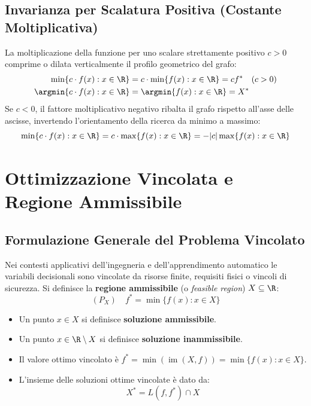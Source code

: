 \subsection{Invarianza per Scalatura Positiva (Costante Moltiplicativa)}
La moltiplicazione della funzione per uno scalare strettamente positivo $c > 0$ comprime o dilata verticalmente il profilo geometrico del grafo:
\begin{align}
\min \{ c \cdot f(x) : x \in \R \} &= c \cdot \min \{ f(x) : x \in \R \} = c f^* \quad (c > 0) \\
\argmin \{ c \cdot f(x) : x \in \R \} &= \argmin \{ f(x) : x \in \R \} = X^*
\end{align}
Se $c < 0$, il fattore moltiplicativo negativo ribalta il grafo rispetto all'asse delle ascisse, invertendo l'orientamento della ricerca da minimo a massimo:
\begin{equation}
\min \{ c \cdot f(x) : x \in \R \} = c \cdot \max \{ f(x) : x \in \R \} = - |c| \max \{ f(x) : x \in \R \}
\end{equation}


\FloatBarrier
\section{Ottimizzazione Vincolata e Regione Ammissibile}
\label{sec:opt-vincolata-regione-ammissibile}

\subsection{Formulazione Generale del Problema Vincolato}
Nei contesti applicativi dell'ingegneria e dell'apprendimento automatico le variabili decisionali sono vincolate da risorse finite, requisiti fisici o vincoli di sicurezza. Si definisce la \textbf{regione ammissibile} (o \textit{feasible region}) $X \subseteq \R$:
\begin{equation}
(P_X) \quad f^* = \min \{ f(x) : x \in X \}
\end{equation}
\begin{itemize}
    \item Un punto $x \in X$ si definisce \textbf{soluzione ammissibile}.
    \item Un punto $x \in \R \setminus X$ si definisce \textbf{soluzione inammissibile}.
    \item Il valore ottimo vincolato \`e $f^* = \min(\operatorname{im}(X, f)) = \min \{ f(x) : x \in X \}$.
    \item L'insieme delle soluzioni ottime vincolate \`e dato da:
    \begin{equation}
    X^* = L(f, f^*) \cap X
    \end{equation}
\end{itemize}

